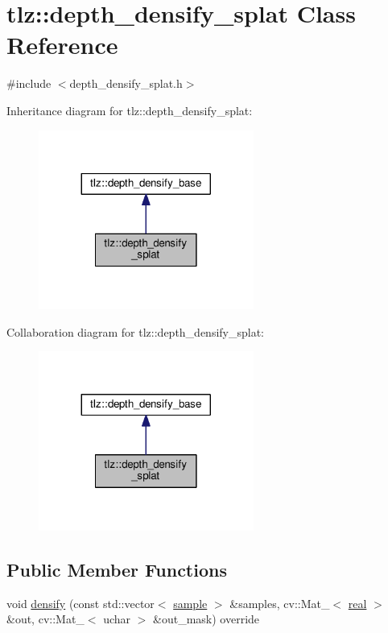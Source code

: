 \hypertarget{classtlz_1_1depth__densify__splat}{}\section{tlz\+:\+:depth\+\_\+densify\+\_\+splat Class Reference}
\label{classtlz_1_1depth__densify__splat}


{\ttfamily \#include $<$depth\+\_\+densify\+\_\+splat.\+h$>$}



Inheritance diagram for tlz\+:\+:depth\+\_\+densify\+\_\+splat\+:
\nopagebreak
\begin{figure}[H]
\begin{center}
\leavevmode
\includegraphics[width=200pt]{classtlz_1_1depth__densify__splat__inherit__graph}
\end{center}
\end{figure}


Collaboration diagram for tlz\+:\+:depth\+\_\+densify\+\_\+splat\+:
\nopagebreak
\begin{figure}[H]
\begin{center}
\leavevmode
\includegraphics[width=200pt]{classtlz_1_1depth__densify__splat__coll__graph}
\end{center}
\end{figure}
\subsection*{Public Member Functions}
\begin{DoxyCompactItemize}
\item 
void \hyperlink{classtlz_1_1depth__densify__splat_a980041db19c8ef889359bb6c3f1d5e2d}{densify} (const std\+::vector$<$ \hyperlink{classtlz_1_1depth__densify__base_a79b5945bdb65c2e1d988bf07ad730a09}{sample} $>$ \&samples, cv\+::\+Mat\+\_\+$<$ \hyperlink{namespacetlz_a15fd37cce97f2b8b606af18c2615f602}{real} $>$ \&out, cv\+::\+Mat\+\_\+$<$ uchar $>$ \&out\+\_\+mask) override
\end{DoxyCompactItemize}
